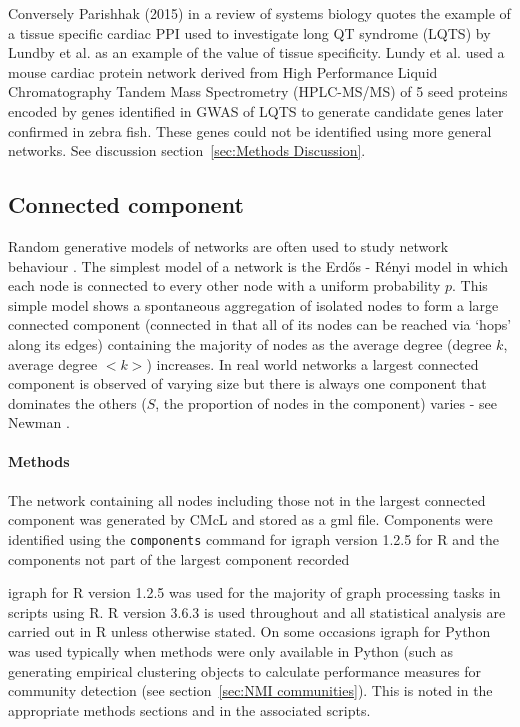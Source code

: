  Conversely Parishhak (2015) in a review of systems biology \cite{parikshak2015systems} quotes the example of a tissue specific cardiac PPI used to investigate long QT syndrome (LQTS) by Lundby et al. \cite{lundby2014annotation} as an example of the value of tissue specificity. Lundy et al. used a mouse cardiac protein network derived from High Performance Liquid Chromatography Tandem Mass Spectrometry (HPLC-MS/MS) of 5 seed proteins encoded by genes identified in GWAS of LQTS to generate candidate genes later confirmed in zebra fish. These genes could not be identified using more general networks. %
 See discussion section~\ref{sec:Methods Discussion}.  



\subsection{Connected component}
\label{sec: PSP graph connected component and missing}
Random generative models of networks are often used to study network behaviour \cite{newman2018networks}. The simplest model of a network is the Erd{\H{o}}s - R{\'e}nyi\cite{erdHos1960evolution} model in which each node is connected to every other node with a uniform probability $p$. %
This simple model shows a spontaneous aggregation of isolated nodes to form a large connected component  (connected in that all of its nodes can be reached via `hops' along its edges) containing the majority of nodes  as the average degree (degree $k$, average degree $<k>$) increases.  In real world networks a largest connected component is observed of varying size but there is always one component that dominates the others ($S$, the proportion of nodes in the component) varies - see Newman \cite{newman2018networks}.
\paragraph{Methods}
The network containing all nodes including those not in the largest connected component was generated by CMcL and stored as a gml file. Components were identified using the \texttt{components} command for igraph version 1.2.5\cite{csardi2006igraph} for R and the components not part of the largest component recorded %

 igraph for R version 1.2.5 was used for the majority of graph processing tasks in scripts using R\cite{csardi2006igraph}. R version 3.6.3\cite{ihaka1996r} is used throughout and  all statistical analysis are carried out in R unless otherwise stated. On some occasions igraph for Python was used typically when methods were only available in Python (such as generating empirical clustering objects to calculate performance measures for community detection (see section~\ref{sec:NMI communities}). This is noted in the appropriate methods sections and in the associated scripts.

